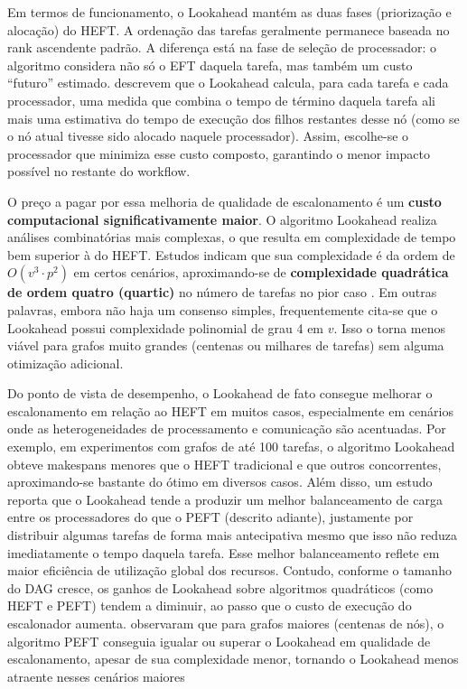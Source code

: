 \documentclass[12pt, %
openright, 
oneside, %
a4paper,    %
brazil]{facom-ufu-abntex2}
\begin{document}
Em termos de funcionamento, o Lookahead mantém as duas fases (priorização e alocação) do HEFT. A
ordenação das tarefas geralmente permanece baseada no rank ascendente padrão. A diferença está na
fase de seleção de processador: o algoritmo considera não só o EFT daquela tarefa, mas também um
custo “futuro” estimado. \cite{bittencourt2010dag} descrevem que o Lookahead calcula, para cada tarefa e cada
processador, uma medida que combina o tempo de término daquela tarefa ali mais uma estimativa do
tempo de execução dos filhos restantes desse nó (como se o nó atual tivesse sido alocado naquele
processador)\cite{bittencourt2010dag}. Assim, escolhe-se o processador que minimiza esse custo composto, garantindo o
menor impacto possível no restante do workflow.

O preço a pagar por essa melhoria de qualidade de escalonamento é um \textbf{custo computacional
significativamente maior}. O algoritmo Lookahead realiza análises combinatórias mais complexas, o
que resulta em complexidade de tempo bem superior à do HEFT. Estudos indicam que sua
complexidade é da ordem de $O(v^3 \cdot p^2)$ em certos cenários, aproximando-se de\textbf{ complexidade
quadrática de ordem quatro (quartic)} no número de tarefas no pior caso\cite{niyom2016fast} \cite{arabnejad2013list}.  Em outras palavras,
embora não haja um consenso simples, frequentemente cita-se que o Lookahead possui complexidade
polinomial de grau 4 em $v$. Isso o torna menos viável para grafos muito grandes (centenas ou
milhares de tarefas) sem alguma otimização adicional.

Do ponto de vista de desempenho, o Lookahead de fato consegue melhorar o escalonamento em
relação ao HEFT em muitos casos, especialmente em cenários onde as heterogeneidades de
processamento e comunicação são acentuadas. Por exemplo, em experimentos com grafos de até 100
tarefas, o algoritmo Lookahead obteve makespans menores que o HEFT tradicional e que outros
concorrentes, aproximando-se bastante do ótimo em diversos casos\cite{arabnejad2013list}. Além disso, um estudo
reporta que o Lookahead tende a produzir um melhor balanceamento de carga entre os processadores
do que o PEFT (descrito adiante), justamente por distribuir algumas tarefas de forma mais antecipativa
mesmo que isso não reduza imediatamente o tempo daquela tarefa\cite{sandokji2019communication}.  Esse melhor balanceamento
reflete em maior eficiência de utilização global dos recursos. Contudo, conforme o tamanho do DAG
cresce, os ganhos de Lookahead sobre algoritmos quadráticos (como HEFT e PEFT) tendem a diminuir,
ao passo que o custo de execução do escalonador aumenta. \cite{arabnejad2013list} observaram que
para grafos maiores (centenas de nós), o algoritmo PEFT conseguia igualar ou superar o Lookahead em
qualidade de escalonamento, apesar de sua complexidade menor, tornando o Lookahead menos
atraente nesses cenários maiores\cite{arabnejad2013list}
\end{document}
